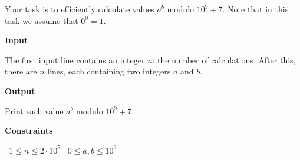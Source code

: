 Your task is to efficiently calculate values $a^b$ modulo $10^9+7$.
Note that in this task we assume that $0^0=1$.

\vspace{0.3cm}\noindent\textbf{Input}

The first input line contains an integer $n$: the number of calculations.
After this, there are $n$ lines, each containing two integers $a$ and $b$.

\vspace{0.3cm}\noindent\textbf{Output}

Print each value $a^b$ modulo $10^9+7$.

\vspace{0.3cm}\noindent\textbf{Constraints}

\textbullet\ $1 \le n \le 2 \cdot 10^5$
\textbullet\ $0 \le a,b \le 10^9$